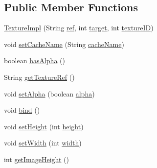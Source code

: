\subsection*{Public Member Functions}
\begin{DoxyCompactItemize}
\item 
\mbox{\hyperlink{classorg_1_1newdawn_1_1slick_1_1opengl_1_1_texture_impl_a04f8674fa2ba26890ca2bf8c967db81c}{Texture\+Impl}} (String \mbox{\hyperlink{classorg_1_1newdawn_1_1slick_1_1opengl_1_1_texture_impl_af482ec27b29b8846d98ce87bfcd88223}{ref}}, int \mbox{\hyperlink{classorg_1_1newdawn_1_1slick_1_1opengl_1_1_texture_impl_a5809d68afec3342e54fc4520f04a596a}{target}}, int \mbox{\hyperlink{classorg_1_1newdawn_1_1slick_1_1opengl_1_1_texture_impl_a6dba48b815f4fc5a37e9c4390f349c9e}{texture\+ID}})
\item 
void \mbox{\hyperlink{classorg_1_1newdawn_1_1slick_1_1opengl_1_1_texture_impl_ab98817505bb3ecdc635803b946ea960e}{set\+Cache\+Name}} (String \mbox{\hyperlink{classorg_1_1newdawn_1_1slick_1_1opengl_1_1_texture_impl_a2b5b9b6700d8cc41e1bd79adbf2bf8fc}{cache\+Name}})
\item 
boolean \mbox{\hyperlink{classorg_1_1newdawn_1_1slick_1_1opengl_1_1_texture_impl_ae07673bff3b44a0f681a8ec9a9a5fadf}{has\+Alpha}} ()
\item 
String \mbox{\hyperlink{classorg_1_1newdawn_1_1slick_1_1opengl_1_1_texture_impl_a9d766e8c7e6ac8197f358066cfe418e5}{get\+Texture\+Ref}} ()
\item 
void \mbox{\hyperlink{classorg_1_1newdawn_1_1slick_1_1opengl_1_1_texture_impl_a2a99120ac7e938687b55606114ee5e21}{set\+Alpha}} (boolean \mbox{\hyperlink{classorg_1_1newdawn_1_1slick_1_1opengl_1_1_texture_impl_a315687e46129b509c38a9f0ab10adee4}{alpha}})
\item 
void \mbox{\hyperlink{classorg_1_1newdawn_1_1slick_1_1opengl_1_1_texture_impl_a181498048d34fa8da8a86613d524f68e}{bind}} ()
\item 
void \mbox{\hyperlink{classorg_1_1newdawn_1_1slick_1_1opengl_1_1_texture_impl_a4bc4d5951a5a0a25e2d1e30c2bedb5a3}{set\+Height}} (int \mbox{\hyperlink{classorg_1_1newdawn_1_1slick_1_1opengl_1_1_texture_impl_a53e8d062d8f983a3a1a845d34bdbd834}{height}})
\item 
void \mbox{\hyperlink{classorg_1_1newdawn_1_1slick_1_1opengl_1_1_texture_impl_a42c503751c7342ebfca3a8c5ab7b8c18}{set\+Width}} (int \mbox{\hyperlink{classorg_1_1newdawn_1_1slick_1_1opengl_1_1_texture_impl_a73412d6372fabe2942ffa281f91a830c}{width}})
\item 
int \mbox{\hyperlink{classorg_1_1newdawn_1_1slick_1_1opengl_1_1_texture_impl_a377019eb21fcdf1d9eb340b6ca3cca12}{get\+Image\+Height}} ()

\end{DoxyCompactItemize}
